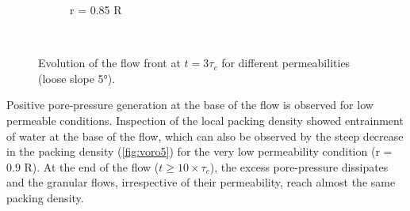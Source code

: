 \begin{figure}
{\begin{subfigure}[b]{0.95\textwidth}
    \caption{r = 0.85 R}
    \label{fig:LBM_660_Slope5_r085}
\end{subfigure}
}\\
\caption{Evolution of the flow front at $t = 3\tau_c$ for different 
permeabilities (loose slope 5\si{\degree}).}
\label{fig:slope_loose_5}
\end{figure}

Positive pore-pressure generation at the base of the flow is observed for low 
permeable conditions. Inspection of the local packing density showed 
entrainment of water at the base of the flow, which can also be observed by the 
steep decrease in the packing density (\cref{fig:voro5}) for the very low 
permeability condition (r = 0.9 R). At the end of the flow ($t \ge 10 \times 
\tau_c$), the excess pore-pressure dissipates and the granular flows, 
irrespective of their permeability, reach almost the same packing density.


